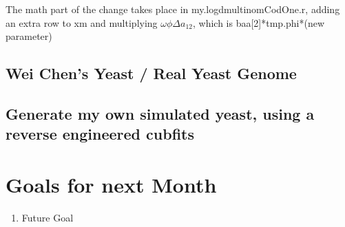 The math part of the change takes place in my.logdmultinomCodOne.r, adding an extra row to xm and multiplying $\omega\phi\Delta a_{12}$, which is baa[2]*tmp.phi*(new parameter)

\subsection{Wei Chen's Yeast / Real Yeast Genome}

\subsection{Generate my own simulated yeast, using a reverse engineered cubfits}



\section{Goals for next Month}
\begin{enumerate}
\item Future Goal
\end{enumerate}


